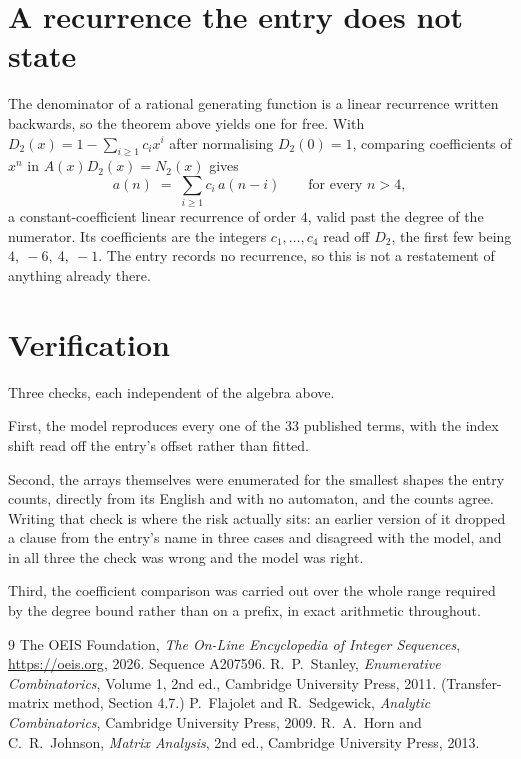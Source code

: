 \documentclass[11pt,a4paper]{article}
\theoremstyle{plain}
\theoremstyle{definition}
\begin{document}
\section{A recurrence the entry does not state}

The denominator of a rational generating function is a linear recurrence written backwards, so
the theorem above yields one for free. With $D_2(x)=1-\sum_{i\ge1}c_ix^i$ after normalising
$D_2(0)=1$, comparing coefficients of $x^n$ in $A(x)D_2(x)=N_2(x)$ gives
\[
a(n)\;=\;\sum_{i\ge1}c_i\,a(n-i)\qquad\text{for every }n>4,
\]
a constant-coefficient linear recurrence of order $4$, valid past the degree of the
numerator. Its coefficients are the integers $c_1,\dots,c_{4}$ read off $D_2$, the first few being $4,\ -6,\ 4,\ -1$. The entry records no recurrence, so this is not a restatement of anything
already there.

\section{Verification}

Three checks, each independent of the algebra above.

First, the model reproduces every one of the $33$ published terms, with the index shift
read off the entry's offset rather than fitted.

Second, the arrays themselves were enumerated for the smallest shapes the entry counts,
directly from its English and with no automaton, and the counts agree. Writing that check is
where the risk actually sits: an earlier version of it dropped a clause from the entry's name
in three cases and disagreed with the model, and in all three the check was wrong and the model
was right.

Third, the coefficient comparison was carried out over the whole range required by the degree
bound rather than on a prefix, in exact arithmetic throughout.

\begin{thebibliography}{9}
 The OEIS Foundation, \emph{The On-Line Encyclopedia of Integer
Sequences}, \url{https://oeis.org}, 2026. Sequence A207596.
 R.~P.~Stanley, \emph{Enumerative Combinatorics}, Volume 1, 2nd ed.,
Cambridge University Press, 2011. (Transfer-matrix method, Section 4.7.)
 P.~Flajolet and R.~Sedgewick, \emph{Analytic Combinatorics}, Cambridge
University Press, 2009.
 R.~A.~Horn and C.~R.~Johnson, \emph{Matrix Analysis}, 2nd ed., Cambridge
University Press, 2013.
\end{thebibliography}
\end{document}
